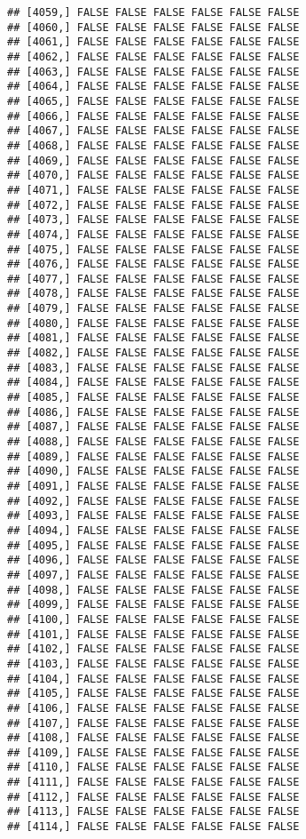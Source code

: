 \documentclass[
]{article}
\begin{document}
\begin{verbatim}
## [4059,] FALSE FALSE FALSE FALSE FALSE FALSE
## [4060,] FALSE FALSE FALSE FALSE FALSE FALSE
## [4061,] FALSE FALSE FALSE FALSE FALSE FALSE
## [4062,] FALSE FALSE FALSE FALSE FALSE FALSE
## [4063,] FALSE FALSE FALSE FALSE FALSE FALSE
## [4064,] FALSE FALSE FALSE FALSE FALSE FALSE
## [4065,] FALSE FALSE FALSE FALSE FALSE FALSE
## [4066,] FALSE FALSE FALSE FALSE FALSE FALSE
## [4067,] FALSE FALSE FALSE FALSE FALSE FALSE
## [4068,] FALSE FALSE FALSE FALSE FALSE FALSE
## [4069,] FALSE FALSE FALSE FALSE FALSE FALSE
## [4070,] FALSE FALSE FALSE FALSE FALSE FALSE
## [4071,] FALSE FALSE FALSE FALSE FALSE FALSE
## [4072,] FALSE FALSE FALSE FALSE FALSE FALSE
## [4073,] FALSE FALSE FALSE FALSE FALSE FALSE
## [4074,] FALSE FALSE FALSE FALSE FALSE FALSE
## [4075,] FALSE FALSE FALSE FALSE FALSE FALSE
## [4076,] FALSE FALSE FALSE FALSE FALSE FALSE
## [4077,] FALSE FALSE FALSE FALSE FALSE FALSE
## [4078,] FALSE FALSE FALSE FALSE FALSE FALSE
## [4079,] FALSE FALSE FALSE FALSE FALSE FALSE
## [4080,] FALSE FALSE FALSE FALSE FALSE FALSE
## [4081,] FALSE FALSE FALSE FALSE FALSE FALSE
## [4082,] FALSE FALSE FALSE FALSE FALSE FALSE
## [4083,] FALSE FALSE FALSE FALSE FALSE FALSE
## [4084,] FALSE FALSE FALSE FALSE FALSE FALSE
## [4085,] FALSE FALSE FALSE FALSE FALSE FALSE
## [4086,] FALSE FALSE FALSE FALSE FALSE FALSE
## [4087,] FALSE FALSE FALSE FALSE FALSE FALSE
## [4088,] FALSE FALSE FALSE FALSE FALSE FALSE
## [4089,] FALSE FALSE FALSE FALSE FALSE FALSE
## [4090,] FALSE FALSE FALSE FALSE FALSE FALSE
## [4091,] FALSE FALSE FALSE FALSE FALSE FALSE
## [4092,] FALSE FALSE FALSE FALSE FALSE FALSE
## [4093,] FALSE FALSE FALSE FALSE FALSE FALSE
## [4094,] FALSE FALSE FALSE FALSE FALSE FALSE
## [4095,] FALSE FALSE FALSE FALSE FALSE FALSE
## [4096,] FALSE FALSE FALSE FALSE FALSE FALSE
## [4097,] FALSE FALSE FALSE FALSE FALSE FALSE
## [4098,] FALSE FALSE FALSE FALSE FALSE FALSE
## [4099,] FALSE FALSE FALSE FALSE FALSE FALSE
## [4100,] FALSE FALSE FALSE FALSE FALSE FALSE
## [4101,] FALSE FALSE FALSE FALSE FALSE FALSE
## [4102,] FALSE FALSE FALSE FALSE FALSE FALSE
## [4103,] FALSE FALSE FALSE FALSE FALSE FALSE
## [4104,] FALSE FALSE FALSE FALSE FALSE FALSE
## [4105,] FALSE FALSE FALSE FALSE FALSE FALSE
## [4106,] FALSE FALSE FALSE FALSE FALSE FALSE
## [4107,] FALSE FALSE FALSE FALSE FALSE FALSE
## [4108,] FALSE FALSE FALSE FALSE FALSE FALSE
## [4109,] FALSE FALSE FALSE FALSE FALSE FALSE
## [4110,] FALSE FALSE FALSE FALSE FALSE FALSE
## [4111,] FALSE FALSE FALSE FALSE FALSE FALSE
## [4112,] FALSE FALSE FALSE FALSE FALSE FALSE
## [4113,] FALSE FALSE FALSE FALSE FALSE FALSE
## [4114,] FALSE FALSE FALSE FALSE FALSE FALSE

\end{verbatim}
\end{document}
